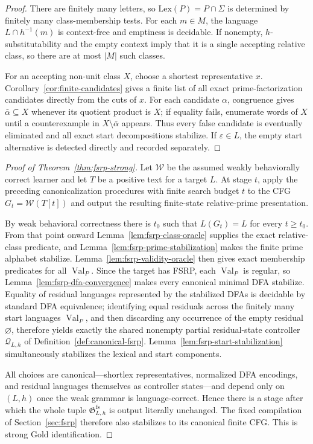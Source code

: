 \documentclass[11pt,a4paper]{article}
\newcommand{\eps}{\varepsilon}
\newcommand{\Qcal}{\mathcal Q}
\newcommand{\Val}{\operatorname{Val}}
\begin{document}
\begin{proof}
There are finitely many letters, so $\mathrm{Lex}(P)=P\cap\Sigma$ is determined by finitely many class-membership tests.  For each $m\in M$, the language $L\cap h^{-1}(m)$ is context-free and emptiness is decidable.  If nonempty, $h$-substitutability and the empty context imply that it is a single accepting relative class, so there are at most $|M|$ such classes.

For an accepting non-unit class $X$, choose a shortest representative $x$.  Corollary~\ref{cor:finite-candidates} gives a finite list of all exact prime-factorization candidates directly from the cuts of $x$.  For each candidate $\alpha$, congruence gives $\bar\alpha\subseteq X$ whenever its quotient product is $X$; if equality fails, enumerate words of $X$ until a counterexample in $X\setminus\bar\alpha$ appears.  Thus every false candidate is eventually eliminated and all exact start decompositions stabilize.  If $\eps\in L$, the empty start alternative is detected directly and recorded separately.
\end{proof}

\begin{proof}[Proof of Theorem~\ref{thm:fsrp-strong}]
Let $\mathcal W$ be the assumed weakly behaviorally correct learner and let $T$ be a positive text for a target $L$.  At stage $t$, apply the preceding canonicalization procedures with finite search budget $t$ to the CFG $G_t=\mathcal W(T[t])$ and output the resulting finite-state relative-prime presentation.

By weak behavioral correctness there is $t_0$ such that $L(G_t)=L$ for every $t\ge t_0$.  From that point onward Lemma~\ref{lem:fsrp-class-oracle} supplies the exact relative-class predicate, and Lemma~\ref{lem:fsrp-prime-stabilization} makes the finite prime alphabet stabilize.  Lemma~\ref{lem:fsrp-validity-oracle} then gives exact membership predicates for all $\Val_P$.  Since the target has FSRP, each $\Val_P$ is regular, so Lemma~\ref{lem:fsrp-dfa-convergence} makes every canonical minimal DFA stabilize.  Equality of residual languages represented by the stabilized DFAs is decidable by standard DFA equivalence; identifying equal residuals across the finitely many start languages $\Val_P$, and then discarding any occurrence of the empty residual $\varnothing$, therefore yields exactly the shared nonempty partial residual-state controller $\Qcal_{L,h}$ of Definition~\ref{def:canonical-fsrp}.  Lemma~\ref{lem:fsrp-start-stabilization} simultaneously stabilizes the lexical and start components.

All choices are canonical---shortlex representatives, normalized DFA encodings, and residual languages themselves as controller states---and depend only on $(L,h)$ once the weak grammar is language-correct.  Hence there is a stage after which the whole tuple $\mathfrak G^{\mathrm{fs}}_{L,h}$ is output literally unchanged.  The fixed compilation of Section~\ref{sec:fsrp} therefore also stabilizes to its canonical finite CFG.  This is strong Gold identification.
\end{proof}
\end{document}
